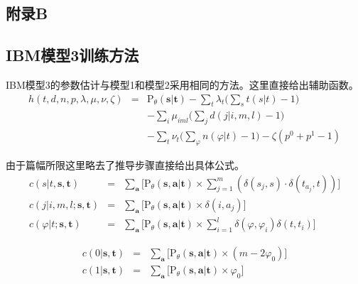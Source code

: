 \begin{appendices}
\chapter{附录B}
\label{appendix-B}


\section{IBM模型3训练方法}
\parinterval IBM模型3的参数估计与模型1和模型2采用相同的方法。这里直接给出辅助函数。
\begin{eqnarray}
h(t,d,n,p, \lambda,\mu, \nu, \zeta) & = &  \textrm{P}_{\theta}(\mathbf{s}|\mathbf{t})-\sum_{t}\lambda_{t}\big(\sum_{s}t(s|t)-1\big)  \nonumber \\
& & -\sum_{i}\mu_{iml}\big(\sum_{j}d(j|i,m,l)-1\big) \nonumber \\
& & -\sum_{t}\nu_{t}\big(\sum_{\varphi}n(\varphi|t)-1\big)-\zeta(p^0+p^1-1)
\label{eq:1.1}
\end{eqnarray}

\parinterval 由于篇幅所限这里略去了推导步骤直接给出具体公式。
\begin{eqnarray}
c(s|t,\mathbf{s},\mathbf{t}) & = & \sum_{\mathbf{a}}\big[\textrm{P}_{\theta}(\mathbf{s},\mathbf{a}|\mathbf{t}) \times \sum_{j=1}^{m} (\delta(s_j,s) \cdot \delta(t_{a_{j}},t))\big] \label{eq:1.2} \\
c(j|i,m,l;\mathbf{s},\mathbf{t}) & = & \sum_{\mathbf{a}}\big[\textrm{P}_{\theta}(\mathbf{s},\mathbf{a}|\mathbf{t}) \times \delta(i,a_j)\big] \label{eq:1.3} \\
c(\varphi|t;\mathbf{s},\mathbf{t}) & = & \sum_{\mathbf{a}}\big[\textrm{P}_{\theta}(\mathbf{s},\mathbf{a}|\mathbf{t}) \times \sum_{i=1}^{l}\delta(\varphi,\varphi_{i})\delta(t,t_i)\big]
\label{eq:1.4}
\end{eqnarray}

\begin{eqnarray}
c(0|\mathbf{s},\mathbf{t}) & = & \sum_{\mathbf{a}}\big[\textrm{P}_{\theta}(\mathbf{s},\mathbf{a}|\mathbf{t})  \times (m-2\varphi_0) \big] \label{eq:1.5} \\
c(1|\mathbf{s},\mathbf{t}) & = & \sum_{\mathbf{a}}\big[\textrm{P}_{\theta}(\mathbf{s},\mathbf{a}|\mathbf{t}) \times \varphi_0 \big] \label{eq:1.6}
\end{eqnarray}


\end{appendices}
